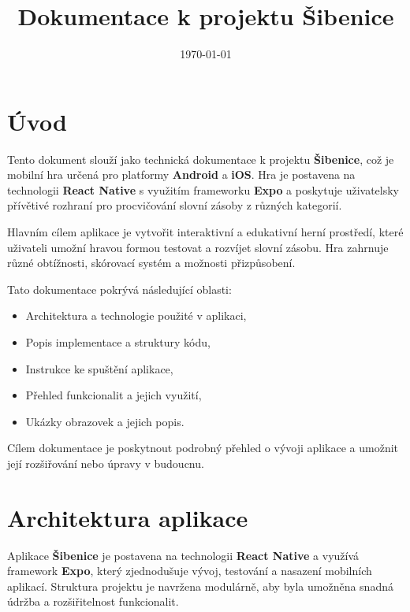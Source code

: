 \documentclass[a4paper,12pt]{article}
\title{Dokumentace k projektu \textbf{Šibenice}}
\author{}
\date{\today}
\begin{document}
\maketitle

\section{Úvod}

Tento dokument slouží jako technická dokumentace k projektu \textbf{Šibenice}, což je mobilní hra určená pro platformy \textbf{Android} a \textbf{iOS}. 
Hra je postavena na technologii \textbf{React Native} s využitím frameworku \textbf{Expo} a poskytuje uživatelsky přívětivé rozhraní pro procvičování slovní zásoby z různých kategorií.

Hlavním cílem aplikace je vytvořit interaktivní a edukativní herní prostředí, které uživateli umožní hravou formou testovat a rozvíjet slovní zásobu. 
Hra zahrnuje různé obtížnosti, skórovací systém a možnosti přizpůsobení. 

Tato dokumentace pokrývá následující oblasti:
\begin{itemize}
    \item Architektura a technologie použité v aplikaci,
    \item Popis implementace a struktury kódu,
    \item Instrukce ke spuštění aplikace,
    \item Přehled funkcionalit a jejich využití,
    \item Ukázky obrazovek a jejich popis.
\end{itemize}

Cílem dokumentace je poskytnout podrobný přehled o vývoji aplikace a umožnit její rozšiřování nebo úpravy v budoucnu.

\section{Architektura aplikace}

Aplikace \textbf{Šibenice} je postavena na technologii \textbf{React Native} a využívá framework \textbf{Expo}, který zjednodušuje vývoj, testování a nasazení mobilních aplikací. Struktura projektu je navržena modulárně, aby byla umožněna snadná údržba a rozšiřitelnost funkcionalit.
\end{document}
